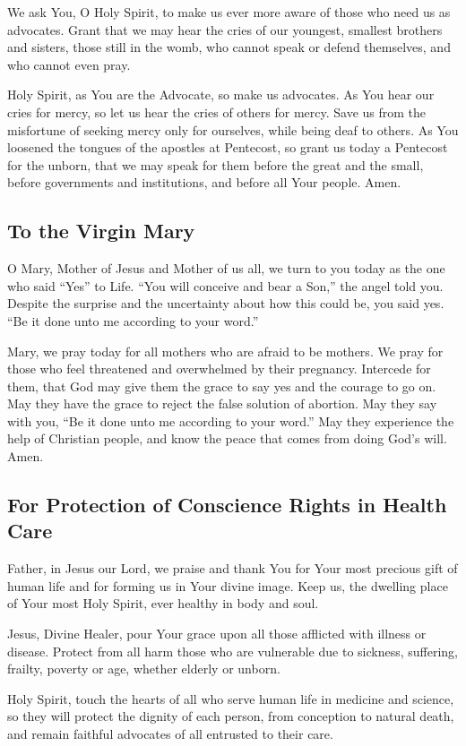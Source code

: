 \documentclass[12pt]{article}
\newcommand{\prayertitle}[1]{\subsection{#1}}
\begin{document}
We ask You, O Holy Spirit, to make us ever more aware of those who need us as advocates.
Grant that we may hear the cries of our youngest, smallest brothers and sisters, those still in the womb, who cannot speak or defend themselves, and who cannot even pray.

Holy Spirit, as You are the Advocate, so make us advocates.
As You hear our cries for mercy, so let us hear the cries of others for mercy.
Save us from the misfortune of seeking mercy only for ourselves, while being deaf to others.
As You loosened the tongues of the apostles at Pentecost, so grant us today a Pentecost for the unborn, that we may speak for them before the great and the small, before governments and institutions, and before all Your people.
Amen.

\prayertitle{To the Virgin Mary}
O Mary, Mother of Jesus and Mother of us all, we turn to you today as the one who said ``Yes'' to Life.
``You will conceive and bear a Son,'' the angel told you.
Despite the surprise and the uncertainty about how this could be, you said yes.
``Be it done unto me according to your word.''

Mary, we pray today for all mothers who are afraid to be mothers.
We pray for those who feel threatened and overwhelmed by their pregnancy.
Intercede for them, that God may give them the grace to say yes and the courage to go on.
May they have the grace to reject the false solution of abortion.
May they say with you, ``Be it done unto me according to your word.''
May they experience the help of Christian people, and know the peace that comes from doing God's will.
Amen.

\prayertitle{For Protection of Conscience Rights in Health Care}
Father, in Jesus our Lord, we praise and thank You for Your most precious gift of human life and for forming us in Your divine image.
Keep us, the dwelling place of Your most Holy Spirit, ever healthy in body and soul.

Jesus, Divine Healer, pour Your grace upon all those afflicted with illness or disease.
Protect from all harm those who are vulnerable due to sickness, suffering, frailty, poverty or age, whether elderly or unborn.

Holy Spirit, touch the hearts of all who serve human life in medicine and science, so they will protect the dignity of each person, from conception to natural death, and remain faithful advocates of all entrusted to their care.  
\end{document}
